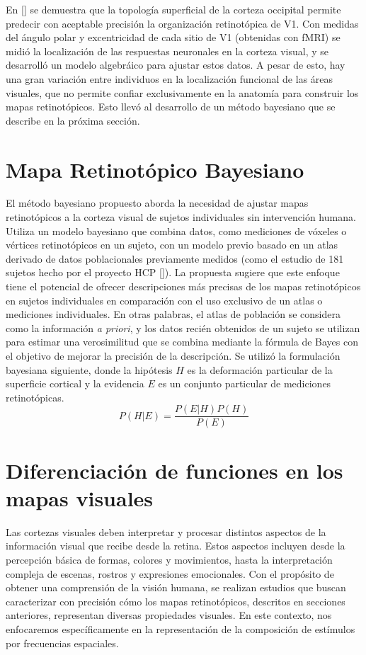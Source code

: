 En [\cite{benson_retinotopic_2012}] se demuestra que la topología superficial de la corteza occipital permite predecir con aceptable precisión la organización retinotópica de V1. Con medidas del ángulo polar y excentricidad de cada sitio de V1 (obtenidas con fMRI) se midió la localización de las respuestas neuronales en la corteza visual, y se desarrolló un modelo algebr\'aico para ajustar estos datos. A pesar de esto, hay una gran variación entre individuos en la localización funcional de las áreas visuales, que no permite confiar exclusivamente en la anatomía para construir los mapas retinotópicos. Esto llevó al desarrollo de un m\'etodo bayesiano que se describe en la próxima sección.

\section{Mapa Retinotópico Bayesiano}

El método bayesiano propuesto aborda la necesidad de ajustar mapas retinotópicos a la corteza visual de sujetos individuales sin intervención humana. Utiliza un modelo bayesiano que combina datos, como mediciones de v\'oxeles o vértices retinotópicos en un sujeto, con un modelo previo basado en un atlas derivado de datos poblacionales previamente medidos (como el estudio de 181 sujetos hecho por el proyecto HCP [\cite{benson_human_2018}]). La propuesta sugiere que este enfoque tiene el potencial de ofrecer descripciones más precisas de los mapas retinotópicos en sujetos individuales en comparación con el uso exclusivo de un atlas o mediciones individuales. En otras palabras, el atlas de población se considera como la información \textit{a priori}, y los datos recién obtenidos de un sujeto se utilizan para estimar una verosimilitud que se combina mediante la fórmula de Bayes con el objetivo de mejorar la precisión de la descripción. Se utiliz\'o la formulaci\'on bayesiana siguiente, donde la hipótesis $H$ es la deformación particular de la superficie cortical y la evidencia $E$ es un conjunto particular de mediciones retinotópicas.
\begin{equation}
	P(H|E) = \dfrac{P(E|H)P(H)}{P(E)}
\end{equation}

\section{Diferenciación de funciones en los mapas visuales}

Las cortezas visuales deben interpretar y procesar distintos aspectos de la información visual que recibe desde la retina. Estos aspectos incluyen desde la percepción básica de formas, colores y movimientos, hasta la interpretación compleja de escenas, rostros y expresiones emocionales. Con el propósito de obtener una comprensión de la visión humana, se realizan estudios que buscan caracterizar con precisión cómo los mapas retinotópicos, descritos en secciones anteriores, representan diversas propiedades visuales. En este contexto, nos enfocaremos específicamente en la representación de la composición de estímulos por frecuencias espaciales.

